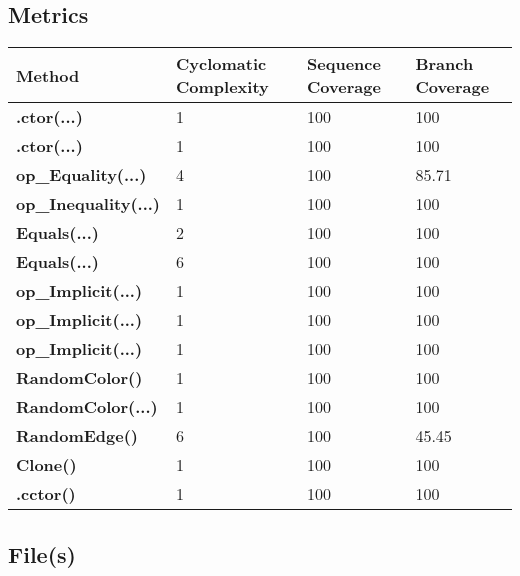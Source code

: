 \documentclass[a4paper,10pt]{article}
\begin{document}
\subsection{Metrics}
\begin{longtable}[l]{|l|l|l|l|}
\hline
\textbf{Method} & \textbf{Cyclomatic Complexity} & \textbf{Sequence Coverage} & \textbf{Branch Coverage}\\
\hline
\textbf{.ctor(...)} & 1 & 100 & 100\\
\hline
\textbf{.ctor(...)} & 1 & 100 & 100\\
\hline
\textbf{op\_Equality(...)} & 4 & 100 & 85.71\\
\hline
\textbf{op\_Inequality(...)} & 1 & 100 & 100\\
\hline
\textbf{Equals(...)} & 2 & 100 & 100\\
\hline
\textbf{Equals(...)} & 6 & 100 & 100\\
\hline
\textbf{op\_Implicit(...)} & 1 & 100 & 100\\
\hline
\textbf{op\_Implicit(...)} & 1 & 100 & 100\\
\hline
\textbf{op\_Implicit(...)} & 1 & 100 & 100\\
\hline
\textbf{RandomColor()} & 1 & 100 & 100\\
\hline
\textbf{RandomColor(...)} & 1 & 100 & 100\\
\hline
\textbf{RandomEdge()} & 6 & 100 & 45.45\\
\hline
\textbf{Clone()} & 1 & 100 & 100\\
\hline
\textbf{.cctor()} & 1 & 100 & 100\\
\hline
\end{longtable}
\subsection{File(s)}
\end{document}
